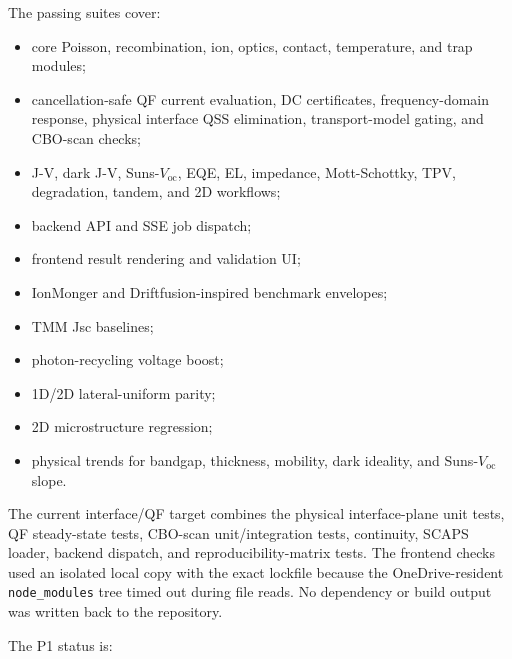\documentclass[
  11pt,
  american,
]{report}
\providecommand{\tightlist}{%
  \setlength{\itemsep}{0pt}\setlength{\parskip}{0pt}}
\begin{document}
The passing suites cover:

\begin{itemize}
\tightlist
\item
  core Poisson, recombination, ion, optics, contact, temperature, and
  trap modules;
\item
  cancellation-safe QF current evaluation, DC certificates,
  frequency-domain response, physical interface QSS elimination,
  transport-model gating, and CBO-scan checks;
\item
  J-V, dark J-V, Suns-\(V_\mathrm{oc}\), EQE, EL, impedance,
  Mott-Schottky, TPV, degradation, tandem, and 2D workflows;
\item
  backend API and SSE job dispatch;
\item
  frontend result rendering and validation UI;
\item
  IonMonger and Driftfusion-inspired benchmark envelopes;
\item
  TMM Jsc baselines;
\item
  photon-recycling voltage boost;
\item
  1D/2D lateral-uniform parity;
\item
  2D microstructure regression;
\item
  physical trends for bandgap, thickness, mobility, dark ideality, and
  Suns-\(V_\mathrm{oc}\) slope.
\end{itemize}

The current interface/QF target combines the physical interface-plane
unit tests, QF steady-state tests, CBO-scan unit/integration tests,
continuity, SCAPS loader, backend dispatch, and reproducibility-matrix
tests. The frontend checks used an isolated local copy with the exact
lockfile because the OneDrive-resident \texttt{node\_modules} tree timed
out during file reads. No dependency or build output was written back to
the repository.

The P1 status is:
\end{document}
